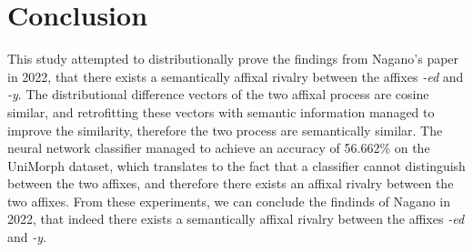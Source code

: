 \documentclass[12pt]{article}
\begin{document}
\section{Conclusion}    
    This study attempted to distributionally prove the findings from Nagano's paper in 2022, that there exists a semantically affixal rivalry between the affixes \emph{-ed} and \emph{-y}. The distributional difference vectors of the two affixal process are cosine similar, and retrofitting these vectors with semantic information managed to improve the similarity, therefore the two process are semantically similar. The neural network classifier managed to achieve an accuracy of 56.662\% on the UniMorph dataset, which translates to the fact that a classifier cannot distinguish between the two affixes, and therefore there exists an affixal rivalry between the two affixes. From these experiments, we can conclude the findinds of Nagano in 2022, that indeed there exists a semantically affixal rivalry between the affixes \emph{-ed} and \emph{-y}. 
\nocite{*}

\end{document}
